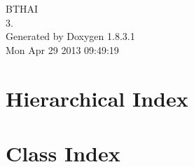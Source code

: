 \documentclass{book}
\begin{document}
\hypersetup{pageanchor=false,citecolor=blue}
\begin{titlepage}
\vspace*{7cm}
\begin{center}
{\Large B\-T\-H\-A\-I \\[1ex]\large 3. }\\
\vspace*{1cm}
{\large Generated by Doxygen 1.8.3.1}\\
\vspace*{0.5cm}
{\small Mon Apr 29 2013 09:49:19}\\
\end{center}
\end{titlepage}
\clearemptydoublepage
{}
\tableofcontents
\clearemptydoublepage
{}
\hypersetup{pageanchor=true,citecolor=blue}
\chapter{Hierarchical Index}

\chapter{Class Index}

\end{document}

